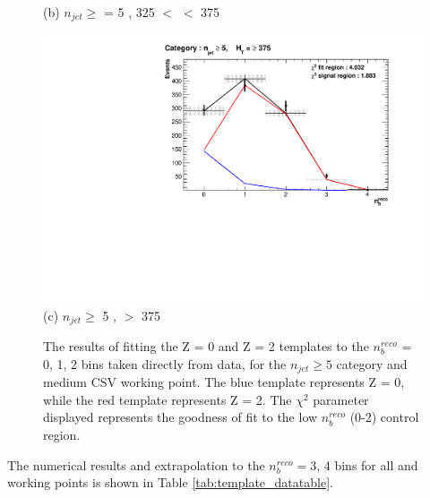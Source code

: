 \begin{figure}[ht]
\begin{minipage}[b]{0.51\linewidth}
\centering (b) $n_{jet} \geq$ = 5 , 325 $<$ \theht $<$ 375 
\end{minipage}
\quad
\begin{minipage}[b]{0.51\linewidth}
\centering
\includegraphics[width = 1.0\linewidth]{plots/ThesisPlots/Final_Fit_To_Data_Normal_Medium_HTBin_OneMuon_Template_375_jet_mult_5.pdf}
\centering (c) $n_{jet} \geq$ 5 , \theht $>$ 375 
\end{minipage}
\caption[The results of fitting the Z = 0 and Z = 2 templates to the $n_{b}^{reco}$ = 0, 1, 2 bins taken from data, for the $n_{jet} \geq 5$ category and medium \ac{CSV} working point.]{The results of fitting the Z = 0 and Z = 2 templates to the $n_{b}^{reco}$ = 0, 1, 2 bins taken directly from data, for the $n_{jet} \geq 5$ category and medium \ac{CSV} working point. The blue template represents Z = 0, while the red template represents Z = 2. The $\chi^{2}$ parameter displayed represents the goodness of fit to the low $n_{b}^{reco}$ (0-2) control region.}
\label{fig:template_data_med_njet5}
\end{figure}

The numerical results and extrapolation to the $n_{b}^{reco} =$3, 4 bins for all \theht and working points is shown in Table \ref{tab:template_datatable}.

